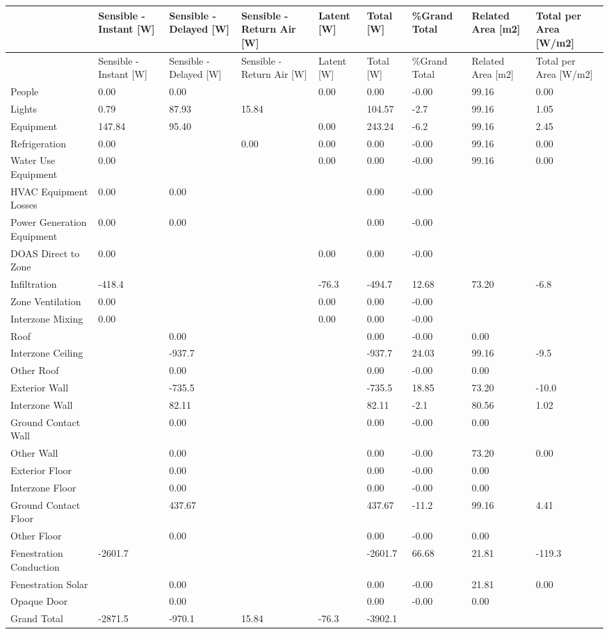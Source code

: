 {\scriptsize

\begin{longtable}[c]{>{\raggedright}p{0.65in}>{\raggedright}p{0.65in}>{\raggedright}p{0.65in}>{\raggedright}p{0.65in}>{\raggedright}p{0.65in}>{\raggedright}p{0.65in}>{\raggedright}p{0.65in}>{\raggedright}p{0.65in}>{\raggedright}p{0.65in}}
\toprule 
 & Sensible - Instant [W] & Sensible - Delayed [W] & Sensible - Return Air [W] & Latent [W] & Total [W] & \%Grand Total & Related Area {[}m2{]} & Total per Area {[}W/m2{]} \tabularnewline
\midrule
\endfirsthead

\toprule 
 & Sensible - Instant [W] & Sensible - Delayed [W] & Sensible - Return Air [W] & Latent [W] & Total [W] & \%Grand Total & Related Area {[}m2{]} & Total per Area {[}W/m2{]} \tabularnewline
\midrule
\endhead

People & 0.00 & 0.00 &  & 0.00 & 0.00 & -0.00 & 99.16 & 0.00 \tabularnewline
Lights & 0.79 & 87.93 & 15.84 &  & 104.57 & -2.7 & 99.16 & 1.05 \tabularnewline
Equipment & 147.84 & 95.40 &  & 0.00 & 243.24 & -6.2 & 99.16 & 2.45 \tabularnewline
Refrigeration & 0.00 &  & 0.00 & 0.00 & 0.00 & -0.00 & 99.16 & 0.00 \tabularnewline
Water Use Equipment & 0.00 &  &  & 0.00 & 0.00 & -0.00 & 99.16 & 0.00 \tabularnewline
HVAC Equipment Losses & 0.00 & 0.00 &  &  & 0.00 & -0.00 &  &  \tabularnewline
Power Generation Equipment & 0.00 & 0.00 &  &  & 0.00 & -0.00 &  &  \tabularnewline
DOAS Direct to Zone & 0.00 &  &  & 0.00 & 0.00 & -0.00 &  &  \tabularnewline
Infiltration & -418.4 &  &  & -76.3 & -494.7 & 12.68 & 73.20 & -6.8 \tabularnewline
Zone Ventilation & 0.00 &  &  & 0.00 & 0.00 & -0.00 &  &  \tabularnewline
Interzone Mixing & 0.00 &  &  & 0.00 & 0.00 & -0.00 &  &  \tabularnewline
Roof &  & 0.00 &  &  & 0.00 & -0.00 & 0.00 &  \tabularnewline
Interzone Ceiling &  & -937.7 &  &  & -937.7 & 24.03 & 99.16 & -9.5 \tabularnewline
Other Roof &  & 0.00 &  &  & 0.00 & -0.00 & 0.00 &  \tabularnewline
Exterior Wall &  & -735.5 &  &  & -735.5 & 18.85 & 73.20 & -10.0 \tabularnewline
Interzone Wall &  & 82.11 &  &  & 82.11 & -2.1 & 80.56 & 1.02 \tabularnewline
Ground Contact Wall &  & 0.00 &  &  & 0.00 & -0.00 & 0.00 &  \tabularnewline
Other Wall &  & 0.00 &  &  & 0.00 & -0.00 & 73.20 & 0.00 \tabularnewline
Exterior Floor &  & 0.00 &  &  & 0.00 & -0.00 & 0.00 &  \tabularnewline
Interzone Floor &  & 0.00 &  &  & 0.00 & -0.00 & 0.00 &  \tabularnewline
Ground Contact Floor &  & 437.67 &  &  & 437.67 & -11.2 & 99.16 & 4.41 \tabularnewline
Other Floor &  & 0.00 &  &  & 0.00 & -0.00 & 0.00 &  \tabularnewline
Fenestration Conduction & -2601.7 &  &  &  & -2601.7 & 66.68 & 21.81 & -119.3 \tabularnewline
Fenestration Solar &  & 0.00 &  &  & 0.00 & -0.00 & 21.81 & 0.00 \tabularnewline
Opaque Door &  & 0.00 &  &  & 0.00 & -0.00 & 0.00 &  \tabularnewline
Grand Total & -2871.5 & -970.1 & 15.84 & -76.3 & -3902.1 &  &  & \tabularnewline

\bottomrule
\end{longtable}}

